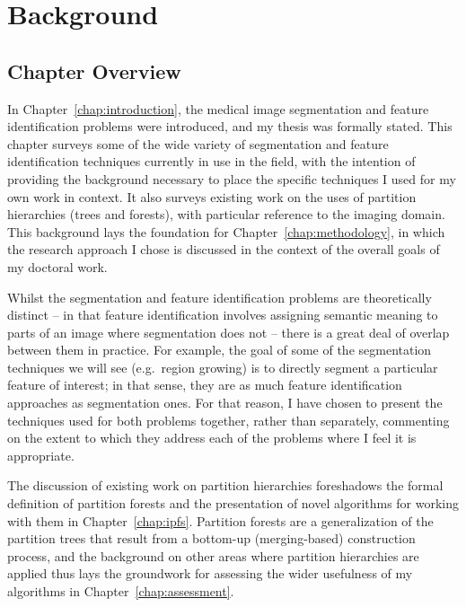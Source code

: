 \chapter{Background}
\label{chap:background}

\section{Chapter Overview}

In Chapter~\ref{chap:introduction}, the medical image segmentation and feature identification problems were introduced, and my thesis was formally stated. This chapter surveys some of the wide variety of segmentation and feature identification techniques currently in use in the field, with the intention of providing the background necessary to place the specific techniques I used for my own work in context. It also surveys existing work on the uses of partition hierarchies (trees and forests), with particular reference to the imaging domain. This background lays the foundation for Chapter~\ref{chap:methodology}, in which the research approach I chose is discussed in the context of the overall goals of my doctoral work.

Whilst the segmentation and feature identification problems are theoretically distinct -- in that feature identification involves assigning semantic meaning to parts of an image where segmentation does not -- there is a great deal of overlap between them in practice. For example, the goal of some of the segmentation techniques we will see (e.g.~region growing) is to directly segment a particular feature of interest; in that sense, they are as much feature identification approaches as segmentation ones. For that reason, I have chosen to present the techniques used for both problems together, rather than separately, commenting on the extent to which they address each of the problems where I feel it is appropriate.

\enlargethispage*{\baselineskip}

The discussion of existing work on partition hierarchies foreshadows the formal definition of partition forests and the presentation of novel algorithms for working with them in Chapter~\ref{chap:ipfs}. Partition forests are a generalization of the partition trees that result from a bottom-up (merging-based) construction process, and the background on other areas where partition hierarchies are applied thus lays the groundwork for assessing the wider usefulness of my algorithms in Chapter~\ref{chap:assessment}.


